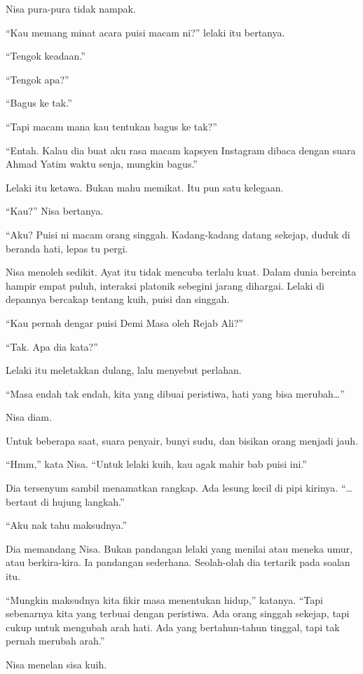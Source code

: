 \documentclass[
  11pt,
  a5paper,
  openany,
  oneside]{book}
\begin{document}
Nisa pura-pura tidak nampak.

``Kau memang minat acara puisi macam ni?'' lelaki itu bertanya.

``Tengok keadaan.''

``Tengok apa?''

``Bagus ke tak.''

``Tapi macam mana kau tentukan bagus ke tak?''

``Entah. Kalau dia buat aku rasa macam kapsyen Instagram dibaca dengan
suara Ahmad Yatim waktu senja, mungkin bagus.''

Lelaki itu ketawa. Bukan mahu memikat. Itu pun satu kelegaan.

``Kau?'' Nisa bertanya.

``Aku? Puisi ni macam orang singgah. Kadang-kadang datang sekejap, duduk
di beranda hati, lepas tu pergi.

Nisa menoleh sedikit. Ayat itu tidak mencuba terlalu kuat. Dalam dunia
bercinta hampir empat puluh, interaksi platonik sebegini jarang
dihargai. Lelaki di depannya bercakap tentang kuih, puisi dan singgah.

``Kau pernah dengar puisi Demi Masa oleh Rejab Ali?''

``Tak. Apa dia kata?''

Lelaki itu meletakkan dulang, lalu menyebut perlahan.

``Masa endah tak endah, kita yang dibuai peristiwa, hati yang bisa
merubah\ldots''

Nisa diam.

Untuk beberapa saat, suara penyair, bunyi sudu, dan bisikan orang
menjadi jauh.

``Hmm,'' kata Nisa. ``Untuk lelaki kuih, kau agak mahir bab puisi ini.''

Dia tersenyum sambil menamatkan rangkap. Ada lesung kecil di pipi
kirinya. ``\ldots bertaut di hujung langkah.''

``Aku nak tahu maksudnya.''

Dia memandang Nisa. Bukan pandangan lelaki yang menilai atau meneka
umur, atau berkira-kira. Ia pandangan sederhana. Seolah-olah dia
tertarik pada soalan itu.

``Mungkin maksudnya kita fikir masa menentukan hidup,'' katanya. ``Tapi
sebenarnya kita yang terbuai dengan peristiwa. Ada orang singgah
sekejap, tapi cukup untuk mengubah arah hati. Ada yang bertahun-tahun
tinggal, tapi tak pernah merubah arah.''

Nisa menelan sisa kuih.
\end{document}
